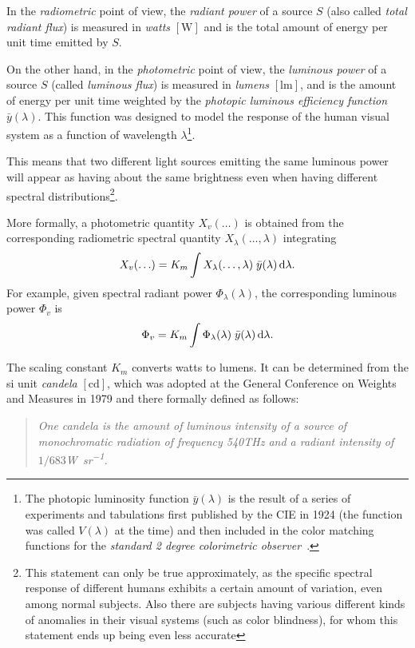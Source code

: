 In the \textsl{radiometric} point of view, the \textsl{radiant power} of a
source $S$
(also called \textsl{total radiant flux}) is measured in
\textit{watts} $[\unit{\watt}]$ and is the total amount of energy per unit time
emitted by $S$.

On the other hand, in the \textsl{photometric} point of view, the
\textsl{luminous power}
of a source $S$ (called \textsl{luminous flux}) is measured in
\textit{lumens} $[\unit{\lumen}]$, and is the amount of energy per unit time
weighted by the \textsl{photopic luminous efficiency function} $\bar y(\lambda)$. 
This function was designed to model the response of the human visual system as a function of wavelength $\lambda$\footnote{
	The photopic luminosity function $\bar y(\lambda)$ is the result of a series of experiments and tabulations first published by the \gls{CIE} in 1924 (the function was called $V(\lambda)$ at the time) and then included in the color matching functions for the \emph{standard 2 degree colorimetric observer}~\citep{cie1931}.}.

This means that two different light sources emitting the same luminous
power will appear as having about the same brightness even when having
different spectral distributions\footnote{This
statement can only be true approximately, as the specific spectral response
of different humans exhibits a certain amount of variation, even among
normal subjects.
Also there are subjects having various different kinds of anomalies in their
visual systems (such as color blindness), for whom this statement ends up being even less accurate}.

More formally, a photometric quantity $X_v(\ldots)$ is obtained from 
the corresponding radiometric spectral quantity $X_{\lambda}(\ldots, \lambda)$
integrating
\begin{equation}
X_v(\ldots) = K_m \int X_{\lambda}(\ldots,\lambda)\; \bar y (\lambda) \mathop{}\!\mathrm{d}\lambda.
\label{eqn:rad_to_photo}
\end{equation}
For example, given spectral radiant power $\Phi_{\lambda}(\lambda)$, the
corresponding
luminous power $\Phi_v$ is
\begin{displaymath}
\Phi_v = K_m \int \Phi_{\lambda}(\lambda)\; \bar y(\lambda) \mathop{}\!\mathrm{d}\lambda.
\end{displaymath}

The scaling constant $K_m$ converts watts to lumens. It can be determined
from the 
\gls{si} unit \textsl{candela} $[\unit{\candela}]$, which was adopted at
the General Conference on Weights and Measures in 1979 and
there formally defined as follows:
\begin{quote}
\emph{One candela is the amount of luminous intensity of a source of
monochromatic radiation of frequency \num{540}\unit{\tera\hertz} and
a radiant intensity of $1/683$\unit{\watt\per\steradian}.}
\end{quote}

